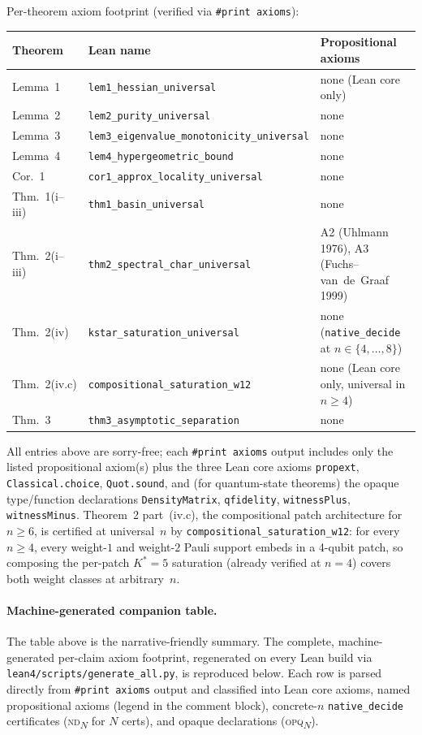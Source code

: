 \documentclass[twocolumn,prx,aps,superscriptaddress,longbibliography]{revtex4-2}
\begin{document}
\medskip
\noindent
Per-theorem axiom footprint (verified via \texttt{\#print axioms}):

\begin{table}[h!]
\centering
\begin{tabular}{lll}
\toprule
\textbf{Theorem} & \textbf{Lean name} & \textbf{Propositional axioms} \\
\midrule
Lemma~1  & \texttt{lem1\_hessian\_universal}
         & none (Lean core only) \\
Lemma~2  & \texttt{lem2\_purity\_universal}
         & none \\
Lemma~3  & \texttt{lem3\_eigenvalue\_monotonicity\_universal}
         & none \\
Lemma~4  & \texttt{lem4\_hypergeometric\_bound}
         & none \\
Cor.~1   & \texttt{cor1\_approx\_locality\_universal}
         & none \\
Thm.~1(i--iii) & \texttt{thm1\_basin\_universal}
         & none \\
Thm.~2(i--iii) & \texttt{thm2\_spectral\_char\_universal}
         & A2 (Uhlmann 1976), A3 (Fuchs--van~de~Graaf 1999) \\
Thm.~2(iv)     & \texttt{kstar\_saturation\_universal}
         & none (\texttt{native\_decide} at $n\in\{4,\ldots,8\}$) \\
Thm.~2(iv.c)   & \texttt{compositional\_saturation\_w12}
         & none (Lean core only, universal in $n\ge4$) \\
Thm.~3   & \texttt{thm3\_asymptotic\_separation}
         & none \\
\bottomrule
\end{tabular}
\end{table}

\noindent
All entries above are sorry-free; each \texttt{\#print axioms}
output includes only the listed propositional axiom(s) plus the
three Lean core axioms \texttt{propext}, \texttt{Classical.choice},
\texttt{Quot.sound}, and (for quantum-state theorems) the opaque
type/function declarations \texttt{DensityMatrix}, \texttt{qfidelity},
\texttt{witnessPlus}, \texttt{witnessMinus}.
Theorem~2 part~(iv.c), the compositional patch architecture for
$n\ge6$, is certified at universal~$n$ by
\texttt{compositional\_saturation\_w12}: for every $n\ge4$, every
weight-$1$ and weight-$2$ Pauli support embeds in a 4-qubit patch,
so composing the per-patch $K^*{=}5$ saturation (already verified
at $n=4$) covers both weight classes at arbitrary~$n$.

\paragraph{Machine-generated companion table.}
The table above is the narrative-friendly summary.  The complete,
machine-generated per-claim axiom footprint, regenerated on every
Lean build via \texttt{lean4/\allowbreak{}scripts/\allowbreak{}generate\_all.py},
is reproduced below.  Each row is parsed directly from
\texttt{\#print axioms} output and classified into Lean core axioms,
named propositional axioms (legend in the comment block), concrete-$n$
\texttt{native\_decide} certificates (\textsc{nd}\textsubscript{$N$} for $N$
certs), and opaque declarations (\textsc{opq}\textsubscript{$N$}).
\end{document}
